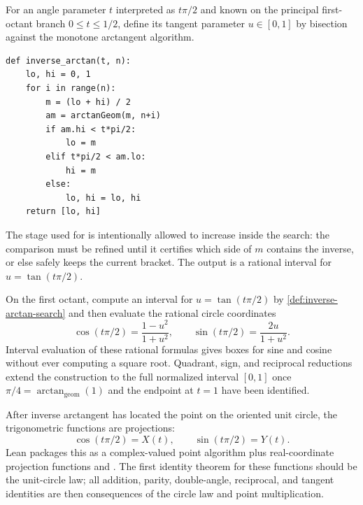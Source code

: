 \begin{definition}
\label{def:inverse-arctan-search}
For an angle parameter \(t\) interpreted as \(t\pi/2\) and known on the
principal first-octant branch \(0\le t\le 1/2\), define its tangent parameter
\(u\in[0,1]\) by bisection against the monotone arctangent algorithm.
\begin{verbatim}
def inverse_arctan(t, n):
    lo, hi = 0, 1
    for i in range(n):
        m = (lo + hi) / 2
        am = arctanGeom(m, n+i)
        if am.hi < t*pi/2:
            lo = m
        elif t*pi/2 < am.lo:
            hi = m
        else:
            lo, hi = lo, hi
    return [lo, hi]
\end{verbatim}
The stage used for  is intentionally allowed to
increase inside the search: the comparison must be refined until it certifies
which side of \(m\) contains the inverse, or else safely keeps the current
bracket.  The output is a rational interval for \(u=\tan(t\pi/2)\).
\end{definition}

\begin{definition}
\label{def:sin-cos-from-inverse-arctan}
On the first octant, compute an interval for \(u=\tan(t\pi/2)\) by
\cref{def:inverse-arctan-search} and then evaluate the rational circle
coordinates
\[
  \cos(t\pi/2)=\frac{1-u^2}{1+u^2},
  \qquad
  \sin(t\pi/2)=\frac{2u}{1+u^2}.
\]
Interval evaluation of these rational formulas gives boxes for sine and
cosine without ever computing a square root.  Quadrant, sign, and reciprocal
reductions extend the construction to the full normalized interval \([0,1]\)
once \(\pi/4=\arctan_{\mathrm{geom}}(1)\) and the endpoint at \(t=1\) have
been identified.
\end{definition}

\begin{definition}
\label{def:sin-cos-from-circle-point}
After inverse arctangent has located the point on the oriented unit circle, the
trigonometric functions are projections:
\[
  \cos(t\pi/2)=X(t),\qquad \sin(t\pi/2)=Y(t).
\]
Lean packages this as a complex-valued point algorithm plus real-coordinate
projection functions  and
.  The first identity theorem for these functions
should be the unit-circle law; all addition, parity, double-angle, reciprocal,
and tangent identities are then consequences of the circle law and point
multiplication.
\end{definition}

